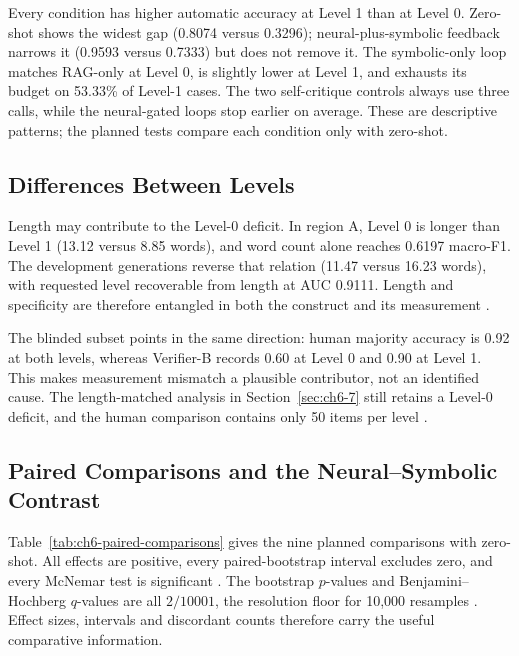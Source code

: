 Every condition has higher automatic accuracy at Level 1 than at Level 0. Zero-shot shows the widest gap (0.8074 versus 0.3296); neural-plus-symbolic feedback narrows it (0.9593 versus 0.7333) but does not remove it. The symbolic-only loop matches RAG-only at Level 0, is slightly lower at Level 1, and exhausts its budget on 53.33\% of Level-1 cases. The two self-critique controls always use three calls, while the neural-gated loops stop earlier on average. These are descriptive patterns; the planned tests compare each condition only with zero-shot.

\subsection{Differences Between Levels}
\label{sec:ch6-3-1}

Length may contribute to the Level-0 deficit. In region A, Level 0 is longer than Level 1 (13.12 versus 8.85 words), and word count alone reaches 0.6197 macro-F1. The development generations reverse that relation (11.47 versus 16.23 words), with requested level recoverable from length at AUC 0.9111. Length and specificity are therefore entangled in both the construct and its measurement \cite{b81}.

The blinded subset points in the same direction: human majority accuracy is 0.92 at both levels, whereas Verifier-B records 0.60 at Level 0 and 0.90 at Level 1. This makes measurement mismatch a plausible contributor, not an identified cause. The length-matched analysis in Section~\ref{sec:ch6-7} still retains a Level-0 deficit, and the human comparison contains only 50 items per level \cite{b36}.

\subsection{Paired Comparisons and the Neural--Symbolic Contrast}
\label{sec:ch6-4}

Table~\ref{tab:ch6-paired-comparisons} gives the nine planned comparisons with zero-shot. All effects are positive, every paired-bootstrap interval excludes zero, and every McNemar test is significant \cite{b49}. The bootstrap $p$-values and Benjamini--Hochberg $q$-values are all $2/10001$, the resolution floor for 10,000 resamples \cite{b50}. Effect sizes, intervals and discordant counts therefore carry the useful comparative information.

